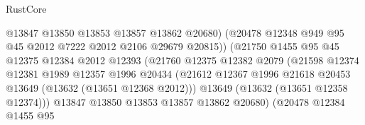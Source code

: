 \begin{lexlean}{RustCore}
\begin{coremodule}
                                        @13847
                                        @13850
                                        @13853
                                        @13857
                                        @13862
                                        @20680)
                                      (@20478
                                        @12348
                                        @949
                                        @95
                                        @45
                                        @2012
                                        @7222
                                        @2012
                                        @2106
                                        @29679
                                        @20815))
                                    (@21750
                                      @1455
                                      @95
                                      @45
                                      @12375
                                      @12384
                                      @2012
                                      @12393
                                      (@21760
                                        @12375
                                        @12382
                                        @2079
                                        (@21598
                                          @12374
                                          @12381
                                          @1989
                                          @12357
                                          @1996
                                          @20434
                                          (@21612
                                            @12367
                                            @1996
                                            @21618
                                            @20453
                                            @13649
                                            (@13632 (@13651 @12368 @2012)))
                                          @13649
                                          (@13632 (@13651 @12358 @12374)))
                                        @13847
                                        @13850
                                        @13853
                                        @13857
                                        @13862
                                        @20680)
                                      (@20478
                                        @12384
                                        @1455
                                        @95

\end{coremodule}
\end{lexlean}
